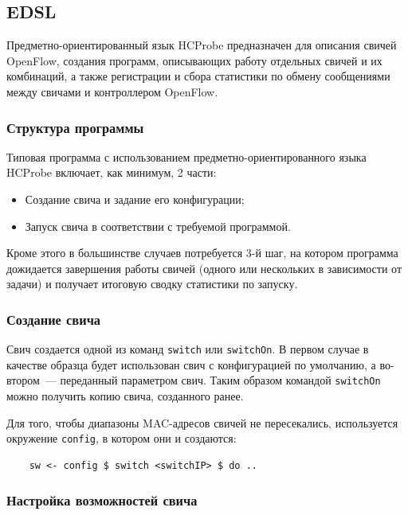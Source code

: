 \documentclass[9pt,a4paper]{article}
\begin{document}
\subsection{EDSL}

Предметно-ориентированный язык HCProbe предназначен для описания свичей OpenFlow,
создания программ, описывающих работу отдельных свичей и их
комбинаций, а также регистрации и сбора статистики по обмену
сообщениями между свичами и контроллером OpenFlow.

\subsubsection{Структура программы}

Типовая программа с использованием предметно-ориентированного языка HCProbe включает,
как минимум, 2 части:

\begin{itemize}
  \item Создание свича и задание его конфигурации;
  \item Запуск свича в соответствии с требуемой программой.
\end{itemize}

Кроме этого в большинстве случаев потребуется 3-й шаг, на котором программа дожидается
завершения работы свичей (одного или нескольких в зависимости от задачи) и получает
итоговую сводку статистики по запуску.

\subsubsection{Создание свича}

Свич создается одной из команд \lstinline!switch! или \lstinline!switchOn!. В первом случае
в качестве образца будет использован свич с конфигурацией по умолчанию, а во-втором~---
переданный параметром свич. Таким образом командой \lstinline!switchOn! можно получить
копию свича, созданного ранее.

Для того, чтобы диапазоны MAC-адресов свичей не пересекались, используется окружение
\lstinline!config!, в котором они и создаются:

\begin{lstlisting}
    sw <- config $ switch <switchIP> $ do ..
\end{lstlisting}%

\subsubsection{Настройка возможностей свича}
\end{document}
